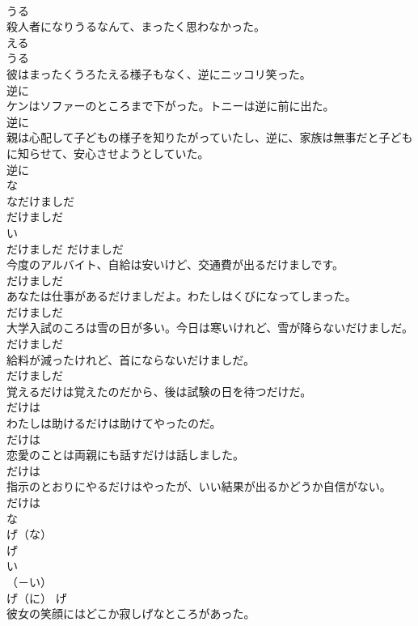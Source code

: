 \documentclass[8pt]{extreport}
\begin{document}
\begin{CJK}{UTF8}{min}
\\	うる
\\	殺人者になりうるなんて、まったく思わなかった。	
\\	える 
\\	うる
\\	彼はまったくうろたえる様子もなく、逆にニッコリ笑った。	
\\	逆に
\\	ケンはソファーのところまで下がった。トニーは逆に前に出た。	
\\	逆に
\\	親は心配して子どもの様子を知りたがっていたし、逆に、家族は無事だと子どもに知らせて、安心させようとしていた。	
\\	逆に
\\	な
\\	なだけましだ	
\\	だけましだ	
\\	い
\\	だけましだ	だけましだ
\\	今度のアルバイト、自給は安いけど、交通費が出るだけましです。	
\\	だけましだ
\\	あなたは仕事があるだけましだよ。わたしはくびになってしまった。	
\\	だけましだ
\\	大学入試のころは雪の日が多い。今日は寒いけれど、雪が降らないだけましだ。	
\\	だけましだ
\\	給料が減ったけれど、首にならないだけましだ。	
\\	だけましだ
\\	覚えるだけは覚えたのだから、後は試験の日を待つだけだ。	
\\	だけは
\\	わたしは助けるだけは助けてやったのだ。	
\\	だけは
\\	恋愛のことは両親にも話すだけは話しました。	
\\	だけは
\\	指示のとおりにやるだけはやったが、いい結果が出るかどうか自信がない。	
\\	だけは
\\	な
\\	げ（な）	
\\	げ	
\\	い
\\	（－い） 
\\	げ（に）	げ
\\	彼女の笑顔にはどこか寂しげなところがあった。	

\end{CJK}
\end{document}
